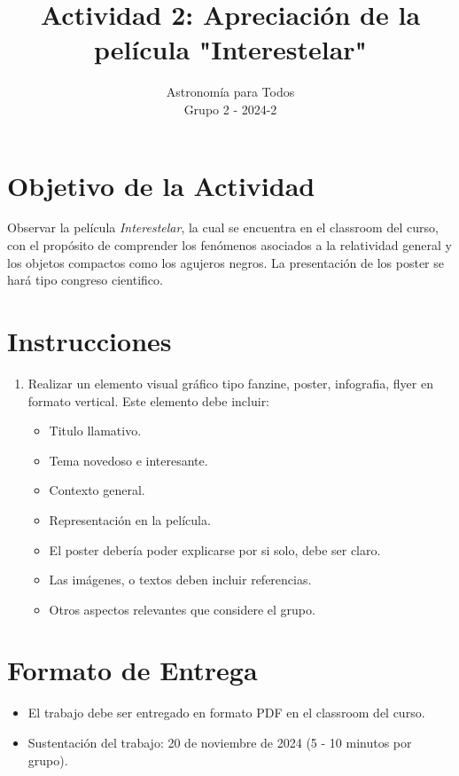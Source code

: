 \documentclass[12pt]{article}
\title{Actividad 2: Apreciación de la película "Interestelar"}
\author{Astronomía para Todos \\ Grupo 2 - 2024-2}
\date{}
\begin{document}
\maketitle

\section*{Objetivo de la Actividad}

Observar la película \textit{Interestelar}, la cual se encuentra en el classroom del curso, con el propósito de comprender los fenómenos asociados a la relatividad general  y los objetos compactos como los agujeros negros.
La presentación de los poster se hará tipo congreso cientifico.

\section*{Instrucciones}

\begin{enumerate}
    \item Realizar un elemento visual gráfico tipo fanzine, poster, infografia, flyer en formato vertical. Este elemento debe incluir:
    \begin{itemize}
        \item Titulo llamativo.
        \item Tema novedoso e interesante.
        \item Contexto general.
        \item Representación en la película.
        \item El poster debería poder explicarse por si solo, debe ser claro.
        \item Las imágenes, o textos deben incluir referencias.
        \item Otros aspectos relevantes que considere el grupo.
    \end{itemize}
\end{enumerate}

\section*{Formato de Entrega}

\begin{itemize}
    \item El trabajo debe ser entregado en formato PDF en el classroom del curso.
    \item Sustentación del trabajo: 20 de noviembre de 2024 (5 - 10 minutos por grupo).
\end{itemize}
\end{document}
